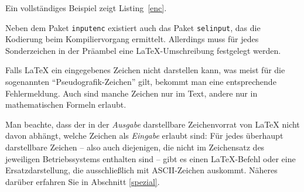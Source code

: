 Ein vollständiges Beispiel zeigt Listing~\ref{enc}.

\begin{example}[caption={Festlegen von Font- und Eingabekodierung sowie des Fonts},label={enc}]
\usepackage[T1]{fontenc}
\usepackage[utf8]{inputenc}
\usepackage{lmodern} %
\end{example}

Neben dem Paket \texttt{inputenc} existiert auch das Paket \texttt{selinput}, das die Kodierung beim Kompiliervorgang ermittelt. Allerdings muss für jedes Sonderzeichen in der Präambel eine \LaTeX-Umschreibung festgelegt werden.

Falls \LaTeX{} ein eingegebenes Zeichen nicht darstellen kann, was meist für die
sogenannten "`Pseudografik-Zeichen"' gilt,  bekommt man eine entsprechende
Fehlermeldung. Auch sind manche Zeichen nur im Text, andere nur in
mathematischen Formeln erlaubt.

Man beachte, dass der in der \emph{Ausgabe} darstellbare Zeichenvorrat von
\LaTeX{} nicht davon abhängt, welche Zeichen als \emph{Eingabe} erlaubt sind:
Für jedes überhaupt darstellbare Zeichen -- also auch diejenigen, die nicht im
Zeichensatz des jeweiligen Betriebssystems enthalten sind -- gibt es einen
\LaTeX-Befehl oder eine Ersatzdarstellung, die ausschließlich mit ASCII-Zeichen
auskommt.  Näheres darüber erfahren Sie in Abschnitt \ref{spezial}.

\endinput
